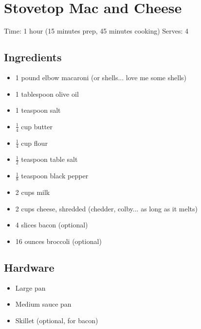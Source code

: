 \section{Stovetop Mac and Cheese}
\label{stovetopMacAndCheese}
\setcounter{secnumdepth}{0}
Time: 1 hour (15 minutes prep, 45 minutes cooking)
Serves: 4

\begin{multicols}{2}
\subsection*{Ingredients}
\begin{itemize}
    \item 1 pound elbow macaroni (or shells... love me some shells)
    \item 1 tablespoon olive oil
    \item 1 teaspoon salt
    \item \( \frac{1}{4} \) cup butter
    \item \( \frac{1}{4} \) cup flour
    \item \( \frac{1}{2} \) teaspoon table salt
    \item \( \frac{1}{8} \) teaspoon black pepper
    \item 2 cups milk
    \item 2 cups cheese, shredded (chedder, colby... as long as it melts)
    \item 4 slices bacon (optional)
    \item 16 ounces broccoli (optional)
\end{itemize}

\subsection*{Hardware}
\begin{itemize}
    \item Large pan
    \item Medium sauce pan
    \item Skillet (optional, for bacon)
\end{itemize}
\clearpage


\end{multicols}
